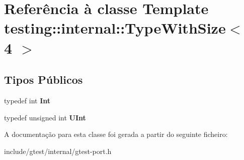 \hypertarget{classtesting_1_1internal_1_1TypeWithSize_3_014_01_4}{\section{Referência à classe Template testing\-:\-:internal\-:\-:Type\-With\-Size$<$ 4 $>$}
\label{classtesting_1_1internal_1_1TypeWithSize_3_014_01_4}
}
\subsection*{Tipos Públicos}
\begin{DoxyCompactItemize}
\item 
\hypertarget{classtesting_1_1internal_1_1TypeWithSize_3_014_01_4_a80351860c00ed665e73f952143f4484a}{typedef int {\bfseries Int}}\label{classtesting_1_1internal_1_1TypeWithSize_3_014_01_4_a80351860c00ed665e73f952143f4484a}

\item 
\hypertarget{classtesting_1_1internal_1_1TypeWithSize_3_014_01_4_a7d559570f830bf35d095eeb94d98de58}{typedef unsigned int {\bfseries U\-Int}}\label{classtesting_1_1internal_1_1TypeWithSize_3_014_01_4_a7d559570f830bf35d095eeb94d98de58}

\end{DoxyCompactItemize}


A documentação para esta classe foi gerada a partir do seguinte ficheiro\-:\begin{DoxyCompactItemize}
\item 
include/gtest/internal/gtest-\/port.\-h\end{DoxyCompactItemize}
